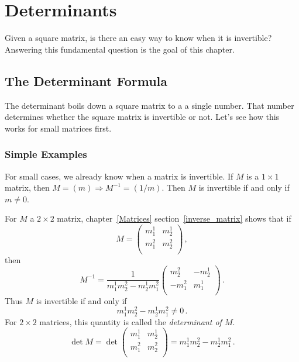 \chapter{Determinants}\label{elementarydeterminants}

Given a square matrix, is there an easy way to know when it is invertible?  Answering this fundamental question is 
the goal of this chapter.

\section{The Determinant Formula}

The determinant boils down a square matrix to a a single number. That number determines whether the square matrix is invertible or not.  
Let's see how this works for small matrices first.

\subsection{Simple Examples}

For small cases, we already know when a matrix is invertible.  If $M$ is a $1\times 1$ matrix, then $M=(m) \Rightarrow M^{-1}=(1/m)$.  Then $M$ is invertible if and only if $m\neq 0$.

\vspace{.3cm}

For $M$ a $2\times 2$ matrix, chapter~\ref{Matrices} section~\ref{inverse_matrix} shows that if \[M=\begin{pmatrix}
m^1_1 & m^1_2 \\[1mm]
m^2_1 & m^2_2 \\
\end{pmatrix}\, ,\] then \[M^{-1}=\frac{1}{m^1_1m^2_2-m^1_2m^2_1}\begin{pmatrix}
m^2_2 & -m^1_2 \\[1mm]
-m^2_1 & m^1_1 \\
\end{pmatrix}\, .\] Thus $M$ is invertible if and only if 
\[m^1_1m^2_2-m^1_2m^2_1\neq 0\, .\]  For $2\times 2$ matrices, this quantity is called the \emph{determinant of $M$}.
\[
\det M = \det \begin{pmatrix}
m^1_1 & m^1_2 \\[1mm]
m^2_1 & m^2_2 \\
\end{pmatrix} = m^1_1m^2_2-m^1_2m^2_1\, .
\]

